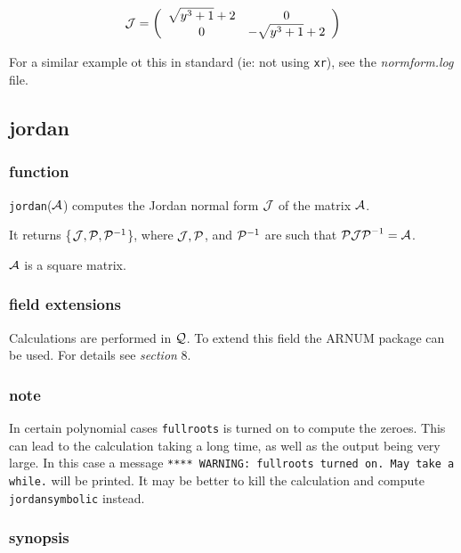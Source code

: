 \vspace{0.2in}
\begin{displaymath}
{\cal J} = \left( \begin{array}{cc} \sqrt{y^3+1} + 2 & 0 \\ 0 & 
-\sqrt{y^3+1} + 2 \end{array} \right)
\end{displaymath}

\vspace{0.2in}
For a similar example ot this in standard {\REDUCE} (ie: not using 
{\tt xr}), see the {\it normform.log} file.

\vspace{0.5in}

\subsection{jordan}

\subsubsection{function}

{\tt jordan}(${\cal A}$) computes the Jordan normal form 
${\cal J}$ of the matrix ${\cal A}$.

It returns \{${\cal J}, {\cal P}, {\cal P}^{-1}$\}, where 
${\cal J}, {\cal P}$, and ${\cal P}^{-1}$ are such that ${\cal P J P}^
{-1} = {\cal A}$. 

${\cal A}$ is a square matrix.

\subsubsection{field extensions}

Calculations are performed in ${\cal Q}$. To extend this field the 
{\small ARNUM} package can be used. For details see {\it section} 8.

\subsubsection{note}
In certain polynomial cases {\tt fullroots} is turned on to compute the 
zeroes. This can lead to the calculation taking a long time, as well as 
the output being very large. In this case a message {\tt ***** WARNING: 
fullroots turned on. May take a while.} will be printed. It may be 
better to kill the calculation and compute {\tt jordansymbolic} instead.

\subsubsection{synopsis}

